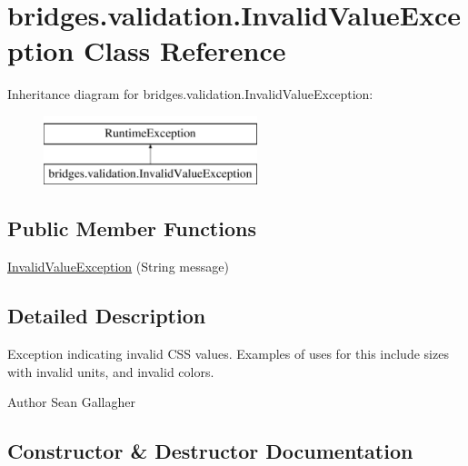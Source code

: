 \hypertarget{classbridges_1_1validation_1_1_invalid_value_exception}{}\section{bridges.\+validation.\+Invalid\+Value\+Exception Class Reference}
\label{classbridges_1_1validation_1_1_invalid_value_exception}
Inheritance diagram for bridges.\+validation.\+Invalid\+Value\+Exception\+:\begin{figure}[H]
\begin{center}
\leavevmode
\includegraphics[height=2.000000cm]{classbridges_1_1validation_1_1_invalid_value_exception}
\end{center}
\end{figure}
\subsection*{Public Member Functions}
\begin{DoxyCompactItemize}
\item 
\hyperlink{classbridges_1_1validation_1_1_invalid_value_exception_adf4c16bcef674454b87d8cc035efc75d}{Invalid\+Value\+Exception} (String message)
\end{DoxyCompactItemize}


\subsection{Detailed Description}
Exception indicating invalid C\+SS values. Examples of uses for this include sizes with invalid units, and invalid colors. \begin{DoxyAuthor}{Author}
Sean Gallagher 
\end{DoxyAuthor}


\subsection{Constructor \& Destructor Documentation}
\hypertarget{classbridges_1_1validation_1_1_invalid_value_exception_adf4c16bcef674454b87d8cc035efc75d}{}\label{classbridges_1_1validation_1_1_invalid_value_exception_adf4c16bcef674454b87d8cc035efc75d} 

